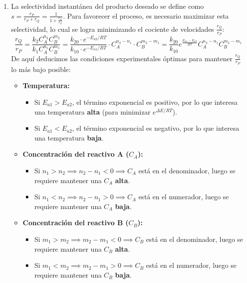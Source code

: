 \begin{enumerate}[label=\alph*)]
	\item La selectividad instantánea del producto deseado se define como $s = \frac{r_P}{r_P + r_Q} = \frac{1}{1 + \frac{r_Q}{r_P}}$. Para favorecer el proceso, es necesario maximizar esta selectividad, lo cual se logra minimizando el cociente de velocidades $\frac{r_Q}{r_P}$:
	      \begin{equation*}
		      \frac{r_Q}{r_P} = \frac{k_2 C_A^{n_2} C_B^{m_2}}{k_1 C_A^{n_1} C_B^{m_1}} = \frac{k_{20} \cdot e^{-E_{a2}/RT}}{k_{10} \cdot e^{-E_{a1}/RT}} \cdot C_A^{n_2 - n_1} \cdot C_B^{m_2 - m_1} = \frac{k_{20}}{k_{10}} e^{\frac{E_{a1}-E_{a2}}{RT}} C_A^{n_2 - n_1} C_B^{m_2 - m_1}
	      \end{equation*}
	      De aquí deducimos las condiciones experimentales óptimas para mantener $\frac{r_Q}{r_P}$ lo más bajo posible:
	      \begin{itemize}
		      \item \textbf{Temperatura:}
		            \begin{itemize}
			            \item Si $E_{a1} > E_{a2}$, el término exponencial es positivo, por lo que interesa una temperatura \textbf{alta} (para minimizar $e^{\Delta E/RT}$).
			            \item Si $E_{a1} < E_{a2}$, el término exponencial es negativo, por lo que interesa una temperatura \textbf{baja}.
		            \end{itemize}
		      \item \textbf{Concentración del reactivo A ($C_A$):}
		            \begin{itemize}
			            \item Si $n_1 > n_2 \implies n_2 - n_1 < 0 \implies C_A$ está en el denominador, luego se requiere mantener una $C_A$ \textbf{alta}.
			            \item Si $n_1 < n_2 \implies n_2 - n_1 > 0 \implies C_A$ está en el numerador, luego se requiere mantener una $C_A$ \textbf{baja}.
		            \end{itemize}
		      \item \textbf{Concentración del reactivo B ($C_B$):}
		            \begin{itemize}
			            \item Si $m_1 > m_2 \implies m_2 - m_1 < 0 \implies C_B$ está en el denominador, luego se requiere mantener una $C_B$ \textbf{alta}.
			            \item Si $m_1 < m_2 \implies m_2 - m_1 > 0 \implies C_B$ está en el numerador, luego se requiere mantener una $C_B$ \textbf{baja}.
		            \end{itemize}
	      \end{itemize}


\end{enumerate}
